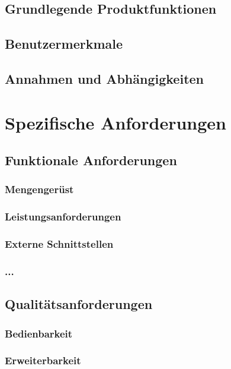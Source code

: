 \documentclass[11pt]{article}
\begin{document}
\subsection{Grundlegende Produktfunktionen}

\subsection{Benutzermerkmale}

\subsection{Annahmen und Abhängigkeiten}

\section{Spezifische Anforderungen}

\subsection{Funktionale Anforderungen}

\subsubsection{Mengengerüst}

\subsubsection{Leistungsanforderungen}

\subsubsection{Externe Schnittstellen}

\subsubsection{...}

\subsection{Qualitätsanforderungen}

\subsubsection{Bedienbarkeit}

\subsubsection{Erweiterbarkeit}
\end{document}

